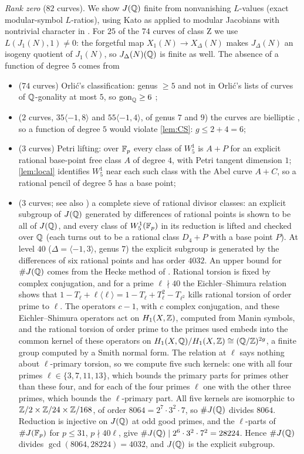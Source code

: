\emph{Rank zero} ($82$ curves). We show $J(\mathbb{Q})$ finite from nonvanishing $L$-values (exact modular-symbol
$L$-ratios), using Kato \cite[Corollary~14.3]{Kato2004} as applied to modular Jacobians with nontrivial
character in \cite[\S4]{DerickxSutherland2017}. For $25$ of the $74$ curves of class Z we use $L(J_1(N),1)\ne0$:
the forgetful map $X_1(N)\to X_\Delta(N)$ makes $J_\Delta(N)$ an isogeny quotient of $J_1(N)$, so $J_\Delta(N)(\mathbb{Q})$ is
finite as well. The absence of a function of degree $5$ comes from
\begin{itemize}
\item[Z] ($74$ curves) Orli\'c's classification: genus $\ge5$ and not in Orli\'c's lists of curves of
 $\mathbb{Q}$-gonality at most $5$, so $\operatorname{gon}_{\mathbb{Q}}\ge6$ \cite{Orlic2025};
\item[B] ($2$ curves, $35\langle-1,8\rangle$ and $55\langle-1,4\rangle$, of genus $7$ and $9$) the curves are
 bielliptic \cite[Theorem~0.2]{JeonKimSchweizer2020}, so a function of degree $5$ would violate
 \cref{lem:CS}: $g\le 2+4=6$;
\item[T] ($3$ curves) Petri lifting: over $\mathbb{F}_p$ every class of $W^1_5$ is $A+P$ for an explicit rational
 base-point free class $A$ of degree $4$, with Petri tangent dimension $1$; \cref{lem:local} identifies $W^1_5$
 near each such class with the Abel curve $A+C$, so a rational pencil of degree $5$ has a base point;
\item[R] ($3$ curves; see also \cite{SuppB}) a complete sieve of rational divisor classes: an explicit subgroup of $J(\mathbb{Q})$ generated
 by differences of rational points is shown to be all of $J(\mathbb{Q})$, and every class of $W^1_5(\mathbb{F}_p)$ in its reduction
 is lifted and checked over $\mathbb{Q}$ (each turns out to be a rational class $D_4+P$ with a base point $P$).
 At level $40$ ($\Delta=\langle-1,3\rangle$, genus $7$) the explicit subgroup is generated by the differences of six
 rational points and has order $4032$. An upper bound for $\#J(\mathbb{Q})$ comes from the Hecke method of
 \cite[\S4.3]{DEH2021}. Rational torsion is fixed by complex conjugation, and for a prime $\ell\nmid40$ the
 Eichler--Shimura relation shows that $1-T_\ell+\ell\langle\ell\rangle=1-T_\ell+T_\ell^2-T_{\ell^2}$ kills rational
 torsion of order prime to $\ell$. The operators $c-1$, with $c$ complex conjugation, and these Eichler--Shimura
 operators act on $H_1(X,\mathbb{Z})$, computed from Manin symbols, and the rational
 torsion of order prime to the primes used embeds into the common kernel of these operators on
 $H_1(X,\mathbb{Q})/H_1(X,\mathbb{Z})\cong(\mathbb{Q}/\mathbb{Z})^{2g}$, a finite group computed by a Smith normal form. The relation at $\ell$
 says nothing about $\ell$-primary torsion, so we compute five such kernels: one with all four primes
 $\ell\in\{3,7,11,13\}$, which bounds the primary parts for primes other than these four, and for each of the
 four primes $\ell$ one with the other three primes, which bounds the $\ell$-primary part. All five kernels are
 isomorphic to $\mathbb{Z}/2\times\mathbb{Z}/24\times\mathbb{Z}/168$, of order $8064=2^7\cdot3^2\cdot7$, so $\#J(\mathbb{Q})$ divides $8064$.
 Reduction is injective on $J(\mathbb{Q})$ at odd good primes, and the $\ell$-parts of $\#J(\mathbb{F}_p)$ for
 $p\le31$, $p\nmid40\ell$, give $\#J(\mathbb{Q})\mid2^6\cdot3^2\cdot7^2=28224$. Hence $\#J(\mathbb{Q})$ divides
 $\gcd(8064,28224)=4032$, and $J(\mathbb{Q})$ is the explicit subgroup.


\end{itemize}
